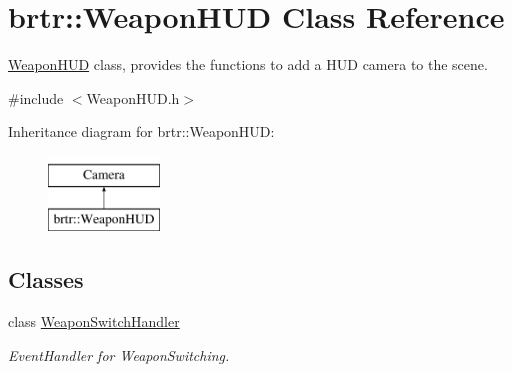 \hypertarget{classbrtr_1_1_weapon_h_u_d}{\section{brtr\+:\+:Weapon\+H\+U\+D Class Reference}
\label{classbrtr_1_1_weapon_h_u_d}
}


\hyperlink{classbrtr_1_1_weapon_h_u_d}{Weapon\+H\+U\+D} class, provides the functions to add a H\+U\+D camera to the scene.  




{\ttfamily \#include $<$Weapon\+H\+U\+D.\+h$>$}

Inheritance diagram for brtr\+:\+:Weapon\+H\+U\+D\+:\begin{figure}[H]
\begin{center}
\leavevmode
\includegraphics[height=2.000000cm]{classbrtr_1_1_weapon_h_u_d}
\end{center}
\end{figure}
\subsection*{Classes}
\begin{DoxyCompactItemize}
\item 
class \hyperlink{classbrtr_1_1_weapon_h_u_d_1_1_weapon_switch_handler}{Weapon\+Switch\+Handler}
\begin{DoxyCompactList}\small\item\em Event\+Handler for Weapon\+Switching. \end{DoxyCompactList}\end{DoxyCompactItemize}
